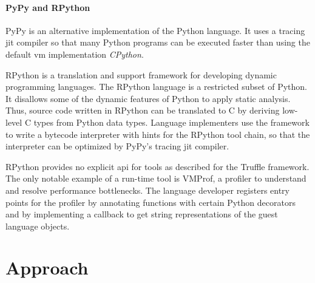 \documentclass[sigplan,10pt,review,anonymous]{acmart}
\begin{document}

    
\paragraph{PyPy and RPython}

PyPy \cite{rigo2006pypy} is an alternative implementation of the Python
\cite{Rossum1995} language. It uses a tracing \ac{jit} compiler
\cite{bolz2009tracing} so that many Python programs can be executed faster than
using the default \ac{vm} implementation \emph{CPython}.

RPython \cite{ancona2007rpython} is a translation and support framework for
developing dynamic programming languages. The RPython language is a restricted
subset of Python. It disallows some of the dynamic features of Python to apply
static analysis. Thus, source code written in RPython can be translated to C by
deriving low-level C types from Python data types. Language implementers use the
framework to write a bytecode interpreter with hints for the RPython tool chain,
so that the interpreter can be optimized by PyPy's tracing \ac{jit} compiler.

RPython provides no explicit \ac{api} for tools as described for the Truffle
framework. The only notable example of a run-time tool is VMProf, a profiler to
understand and resolve performance bottlenecks. The language developer registers
entry points for the profiler by annotating functions with certain Python
decorators and by implementing a callback to get string representations of the
guest language objects.

\section{Approach}
\label{cha:solution}
\end{document}
